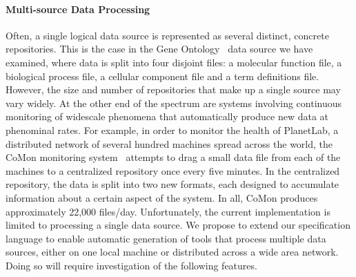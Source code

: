 \paragraph*{Multi-source Data Processing}
Often, a single logical data source is represented
as several distinct, concrete repositories.   This is the case
in the Gene Ontology~\cite{geneontology} data source we have examined,
where data is split into four disjoint 
files: a molecular function file, a biological process file,
a cellular component file and a term definitions file.
However, the size and number of repositories that make up a single source
may vary widely.  At the other end of the spectrum are systems involving
continuous monitoring of widescale phenomena that automatically
produce new data at phenominal rates.  For example, in order to monitor
the health of PlanetLab, a distributed network of several hundred machines
spread across the world, the CoMon monitoring system~\cite{comon} attempts to 
drag a small data file from each of the machines to a centralized repository once every
five minutes.  In the
centralized repository, the data is split into two new formats, each designed to accumulate
information about a certain aspect of the system.  In all, CoMon produces
approximately 22,000 files/day.  Unfortunately, the current \pads{} 
implementation is limited to processing a single data source.
We propose to extend our specification language to enable 
automatic generation of tools
that process multiple data sources, either on one local machine or distributed across a wide area network.  Doing so will require investigation of the 
following features.


